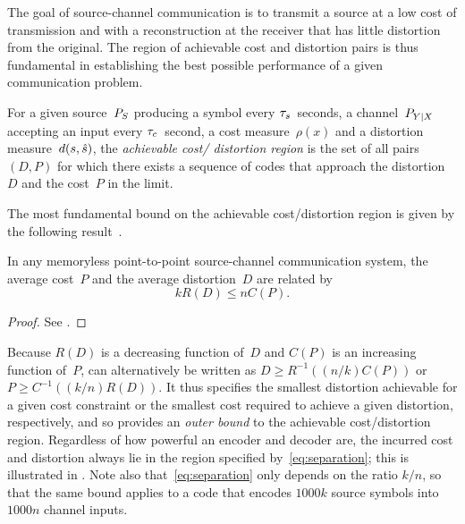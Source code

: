 The goal of source-channel communication is to transmit a source at a low cost
of transmission and with a reconstruction at the receiver that has little
distortion from the original. The region of achievable cost and distortion pairs
is thus fundamental in establishing the best possible performance of a given
communication problem.

\begin{definition}
  \label{def:achievableregion}
  For a given source~${P_S}$ producing a symbol every ${\tau_s}$~seconds, a
  channel~$P_{Y|X}$ accepting an input every ${\tau_c}$~second, a cost measure~$\rho(x)$
  and a distortion measure~$d(s,{\hat{s}})$, the \emph{achievable cost\slash
  distortion region} is the set of all pairs $(D,P)$ for which there exists  a
  sequence of codes that approach the distortion~$D$ and the cost~$P$ in the
  limit.
\end{definition}

The most fundamental bound on the achievable cost/distortion region is given by
the following result~\cite[Theorem~21]{Shannon1948}.

\begin{theorem}
  \label{thm:separationconverse}
  In any memoryless point-to-point source-channel communication system, the
  average cost~$P$ and the average distortion~$D$ are related by
  \begin{equation}
    \label{eq:separation}
    kR(D) \le nC(P).
  \end{equation}
\end{theorem}

\begin{proof}
  See .
\end{proof}

Because $R(D)$ is a decreasing function of~$D$ and $C(P)$ is an increasing
function of~$P$,  can alternatively be written as $D
\ge R^{-1}((n/k) C(P))$ or $P \ge C^{-1}((k/n) R(D))$.  It thus specifies the
smallest distortion achievable for a given cost constraint or the smallest cost
required to achieve a given distortion, respectively, and so provides an
\emph{outer bound} to the achievable cost/distortion region.  Regardless of how
powerful an encoder and decoder are, the incurred cost and distortion always lie
in the region specified by~\eqref{eq:separation}; this is illustrated in
. Note also that~\eqref{eq:separation} only depends on
the ratio $k/n$, so that the same bound applies to a code that encodes $1000k$
source symbols into $1000n$ channel inputs. 


